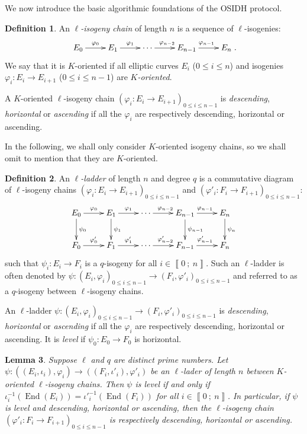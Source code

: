\documentclass[a4paper,10pt,notitlepage]{report}
\theoremstyle{definition}
\newtheorem{Definition}{Definition}[chapter]
\theoremstyle{plain}
\newtheorem{Lemma}[Definition]{Lemma}
\theoremstyle{definition}
\renewcommand{\i}[2]{\left\llbracket #1~;~#2\right\rrbracket}
\renewcommand{\(}{\left(}
\renewcommand{\)}{\right)}
\DeclareMathOperator{\End}{End}
\begin{document}
We now introduce the basic algorithmic foundations of the OSIDH protocol.

\begin{Definition}
An \emph{$\ell$-isogeny chain} of length $n$ is a sequence of $\ell$-isogenies:
\[\xymatrix{
E_0 \ar[r]^{\varphi_0} & E_1 \ar[r]^{\varphi_{1}}& \cdots \ar[r]^{\varphi_{n-2}} & E_{n-1} \ar[r]^{\varphi_{n-1}} & E_n
}.\]
We say that it is $K$-oriented if all elliptic curves $E_i$ ($0\leq i\leq n$) and isogenies $\varphi_i : E_i\longrightarrow E_{i+1}$ ($0\leq i\leq n-1$) are \emph{$K$-oriented}.

A $K$-oriented $\ell$-isogeny chain $(\varphi_i : E_i\longrightarrow E_{i+1})_{0\leq i\leq n-1}$ is \emph{descending}, \emph{horizontal} or \emph{ascending} if all the $\varphi_i$ are respectively descending, horizontal or ascending.
\end{Definition}

In the following, we shall only consider $K$-oriented isogeny chains, so we shall omit to mention that they are $K$-oriented.

\begin{Definition}
An \emph{$\ell$-ladder} of length $n$ and degree $q$ is a commutative diagram of $\ell$-isogeny chains $(\varphi_i:E_i\longrightarrow E_{i+1})_{0\leq i\leq n-1}$ and $(\varphi'_i:F_i\longrightarrow F_{i+1})_{0\leq i\leq n-1}$:
\[\xymatrix{
E_0 \ar[d]^{\psi_0} \ar[r]^{\varphi_0} & E_1\ar[d]^{\psi_1} \ar[r]^{\varphi_{1}}& \cdots \ar[r]^{\varphi_{n-2}} & E_{n-1} \ar[d]^{\psi_{n-1}} \ar[r]^{\varphi_{n-1}} & E_n \ar[d]^{\psi_n}\\
F_0 \ar[r]^{\varphi'_0} & F_1 \ar[r]^{\varphi'_{1}}& \cdots \ar[r]^{\varphi'_{n-2}} & F_{n-1} \ar[r]^{\varphi'_{n-1}} & F_n
}\]
such that $\psi_i : E_i\longrightarrow F_i$ is a $q$-isogeny for all $i\in\i{0}{n}$. Such an $\ell$-ladder is often denoted by $\psi : (E_i,\varphi_i)_{0\leq i\leq n-1}\longrightarrow (F_i,\varphi'_i)_{0\leq i\leq n-1}$ and referred to as a $q$-isogeny between $\ell$-isogeny chains. 

An $\ell$-ladder $\psi : (E_i,\varphi_i)_{0\leq i\leq n-1}\longrightarrow (F_i,\varphi'_i)_{0\leq i\leq n-1}$ is \emph{descending}, \emph{horizontal} or \emph{ascending} if all the $\varphi_i$ are respectively descending, horizontal or ascending.  It is \emph{level} if $\psi_0 : E_0\longrightarrow F_0$ is horizontal.
\end{Definition}

\begin{Lemma}\label{Lemma 2}
Suppose $\ell$ and $q$ are distinct prime numbers. Let $\psi : ((E_i,\iota_i),\varphi_i)\longrightarrow ((F_i,\iota'_i),\varphi'_i)$ be an $\ell$-lader of length $n$ between  $K$-oriented $\ell$-isogeny chains. Then $\psi$ is level if and only if $\iota_i^{-1}(\End(E_i))={\iota'}_i^{-1}(\End(F_i))$ for all $i\in\i{0}{n}$. In particular,  if $\psi$ is level and descending, horizontal or ascending, then the $\ell$-isogeny chain $(\varphi'_i: F_i\longrightarrow F_{i+1})_{0\leq i\leq n-1}$ is respectively descending, horizontal or ascending.
\end{Lemma}
\end{document}
